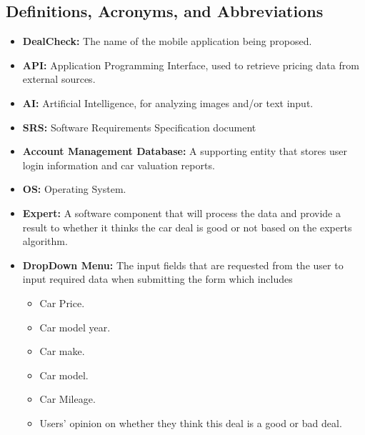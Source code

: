 \documentclass[]{article}
\begin{document}
\subsection{Definitions, Acronyms, and Abbreviations}
\label{sub:definitions_acronyms_and_abbreviations}
\begin{itemize}
    \item \textbf{DealCheck:} The name of the mobile application being proposed.
    \item \textbf{API:} Application Programming Interface, used to retrieve pricing data from external sources.
    \item \textbf{AI:} Artificial Intelligence, for analyzing images and/or text input.
    \item \textbf{SRS:} Software Requirements Specification document 
    \item \textbf{Account Management Database:} A supporting entity that stores user login information and car valuation reports. 
    \item \textbf{OS:} Operating System.
    \item \textbf{Expert:} A software component that will process the data and provide a result to whether it thinks the car deal is good or not based on the experts algorithm.
    \item \textbf{DropDown Menu:} The input fields that are requested from the user to input required data when submitting the form which includes
    \begin{itemize}
        \item Car Price.
        \item Car model year.
        \item Car make.
        \item Car model.
        \item Car Mileage.
        \item Users' opinion on whether they think this deal is a good or bad deal.
    \end{itemize}
\end{itemize}
\end{document}
